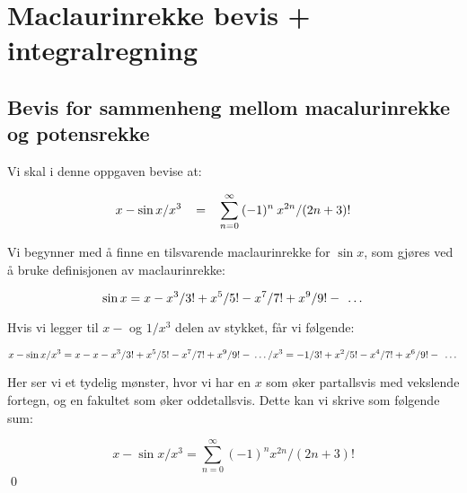 \documentclass[12pt,a4paper]{article}
\def\frac#1#2{#1/#2}%
\begin{document}
\clearpage


\section{Maclaurinrekke bevis + integralregning}
\subsection{Bevis for sammenheng mellom macalurinrekke og potensrekke}
Vi skal i denne oppgaven bevise at:

\begin{equation*}
  \frac{x-\sin{x}}{x^3} \hspace{2ex} 
  = \hspace{2ex} \sum_{n=0}^{\infty} \hspace{0.5ex} (-1)^n \hspace{0.5ex} \frac{x^{2n}}{(2n+3)!}
\end{equation*}


Vi begynner med å finne en tilsvarende maclaurinrekke for $\sin{x}$, 
som gjøres ved å bruke definisjonen av maclaurinrekke:

\begin{equation*}
  \sin{x} = x-\frac{x^3}{3!}+\frac{x^5}{5!}-\frac{x^7}{7!}+\frac{x^9}{9!} -
  \hspace{1ex}\dots
\end{equation*}


Hvis vi legger til $x-$ og $\frac{1}{x^3}$ delen av stykket, får vi følgende:

\begin{equation*}
  \frac{x-\sin{x}}{x^3} = 
  \frac{x - x-\frac{x^3}{3!}+\frac{x^5}{5!}-\frac{x^7}{7!}+\frac{x^9}{9!}-\hspace{0.5ex}\dots}{x^3}
   = -\frac{1}{3!}+\frac{x^2}{5!}-\frac{x^4}{7!}+\frac{x^6}{9!}-\hspace{1ex}\dots
\end{equation*}


Her ser vi et tydelig mønster, 
hvor vi har en $x$ som øker partallsvis med vekslende fortegn, og en fakultet som øker oddetallsvis. 
Dette kan vi skrive som følgende sum:

\begin{equation*}
  \frac{x-\sin{x}}{x^3} = \sum_{n=0}^{\infty} (-1)^n \frac{x^{2n}}{(2n+3)!}
\end{equation*}
\qed
\end{document}
